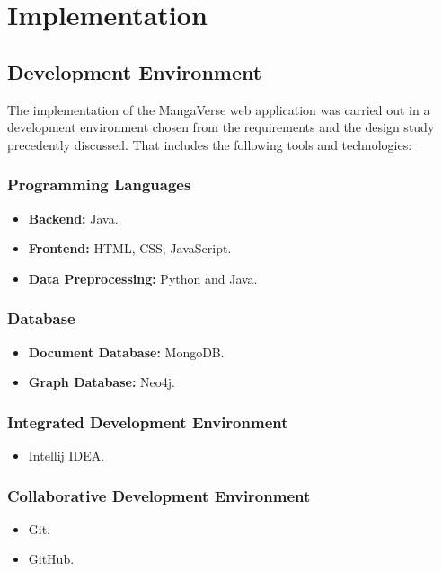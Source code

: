 \chapter{Implementation}

\section{Development Environment}

The implementation of the MangaVerse web application was carried out in a development environment
chosen from the requirements and the design study precedently discussed. 
That includes the following tools and technologies:

\subsection{Programming Languages}
\begin{itemize}
    \item \textbf{Backend:} Java.
    \item \textbf{Frontend:} HTML, CSS, JavaScript.
    \item \textbf{Data Preprocessing:} Python and Java. 
\end{itemize}

\subsection*{Database}
\begin{itemize}
    \item \textbf{Document Database:} MongoDB\@.
    \item \textbf{Graph Database:} Neo4j.
\end{itemize}

\subsection*{Integrated Development Environment} 
\begin{itemize}
    \item Intellij IDEA\@.
\end{itemize}

\subsection*{Collaborative Development Environment}
\begin{itemize}
    \item Git.
    \item GitHub.
\end{itemize}

